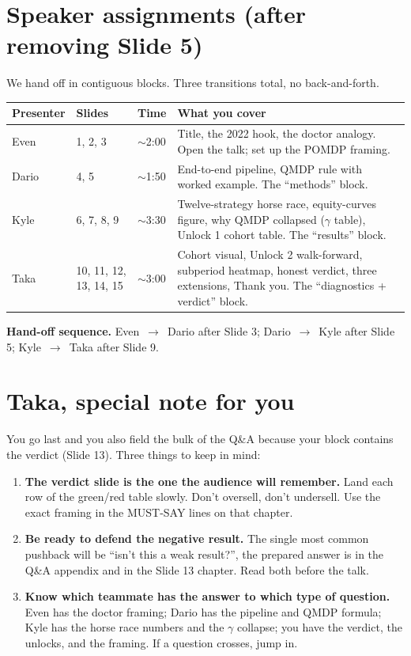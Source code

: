 \documentclass[11pt]{article}
\begin{document}
\section*{Speaker assignments (after removing Slide 5)}

We hand off in contiguous blocks. Three transitions total, no back-and-forth.

\renewcommand{\arraystretch}{1.25}
\begin{center}
\begin{tabular}{l l l p{6.5cm}}
\toprule
\textbf{Presenter} & \textbf{Slides} & \textbf{Time} & \textbf{What you cover} \\
\midrule
Even  & 1, 2, 3           & $\sim$2:00 & Title, the 2022 hook, the doctor analogy. Open the talk; set up the POMDP framing. \\
Dario & 4, 5              & $\sim$1:50 & End-to-end pipeline, QMDP rule with worked example. The ``methods'' block. \\
Kyle  & 6, 7, 8, 9        & $\sim$3:30 & Twelve-strategy horse race, equity-curves figure, why QMDP collapsed ($\gamma$ table), Unlock 1 cohort table. The ``results'' block. \\
Taka  & 10, 11, 12, 13, 14, 15 & $\sim$3:00 & Cohort visual, Unlock 2 walk-forward, subperiod heatmap, honest verdict, three extensions, Thank you. The ``diagnostics + verdict'' block. \\
\bottomrule
\end{tabular}
\end{center}

\textbf{Hand-off sequence.} Even~$\to$~Dario after Slide 3; Dario~$\to$~Kyle after Slide 5; Kyle~$\to$~Taka after Slide 9.

\section*{Taka, special note for you}

You go last and you also field the bulk of the Q\&A because your block contains the verdict (Slide 13). Three things to keep in mind:

\begin{enumerate}
  \item \textbf{The verdict slide is the one the audience will remember.} Land each row of the green/red table slowly. Don't oversell, don't undersell. Use the exact framing in the MUST-SAY lines on that chapter.
  \item \textbf{Be ready to defend the negative result.} The single most common pushback will be ``isn't this a weak result?'', the prepared answer is in the Q\&A appendix and in the Slide 13 chapter. Read both before the talk.
  \item \textbf{Know which teammate has the answer to which type of question.} Even has the doctor framing; Dario has the pipeline and QMDP formula; Kyle has the horse race numbers and the $\gamma$ collapse; you have the verdict, the unlocks, and the framing. If a question crosses, jump in.
\end{enumerate}
\end{document}
